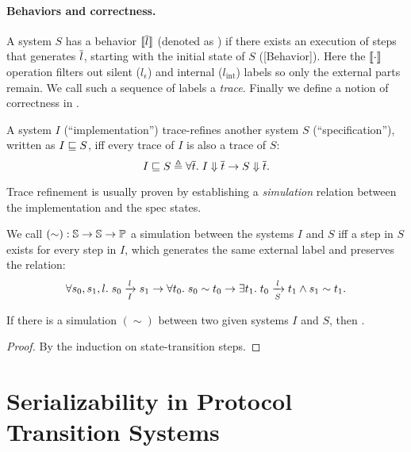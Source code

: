 \documentclass[sigplan,10pt,review,anonymous,screen]{acmart}\settopmatter{printfolios=true,printccs=false,printacmref=false}
\begin{document}
\paragraph{Behaviors and correctness.}
A system $S$ has a behavior $\behOf{\listof{l}}$ (denoted as ) if there exists an execution of steps that generates $\listof{l}$, starting with the initial state of $S$ ([Behavior]).
Here the $\behOf{\cdot}$ operation filters out silent ($l_\epsilon$) and internal ($l_{\textrm{int}}$) labels so only the external parts remain.
We call such a sequence of labels a \emph{trace}.
Finally we define a notion of correctness in \hemiola{}.
\begin{definition}
  A system $I$ (``implementation'') trace-refines another system $S$ (``specification''), written as $\refines{I}{S}$, iff every trace of $I$ is also a trace of $S$:
  \begin{displaymath}
    \refines{I}{S} \triangleq \forall \listof{t}.\; \sembeh{I}{\listof{t}} \to \sembeh{S}{\listof{t}}.
  \end{displaymath}
\end{definition}

Trace refinement is usually proven by establishing a \emph{simulation} relation between the implementation and the spec states.
\begin{definition}[Simulation]
  We call $(\sim): \hstt{} \to \hstt{} \to \propt{}$ a simulation between the systems $I$ and $S$ iff a step in $S$ exists for every step in $I$, which generates the same external label and preserves the relation:
  \begin{displaymath}
    \forall s_0, s_1, l.\; \semstep{I}{s_0}{l}{s_1} \to \forall t_0.\; s_0 \sim t_0 \to
    \exists t_1.\; \semstep{S}{t_0}{l}{t_1} \wedge s_1 \sim t_1.
  \end{displaymath}
\end{definition}
\begin{theorem}
  If there is a simulation $(\sim)$ between two given systems $I$ and $S$, then .
\end{theorem}
\begin{proof}
  By the induction on state-transition steps.
\end{proof}

\section{Serializability in Protocol Transition Systems}
\label{sec-sz-in-hemiola}
\end{document}
